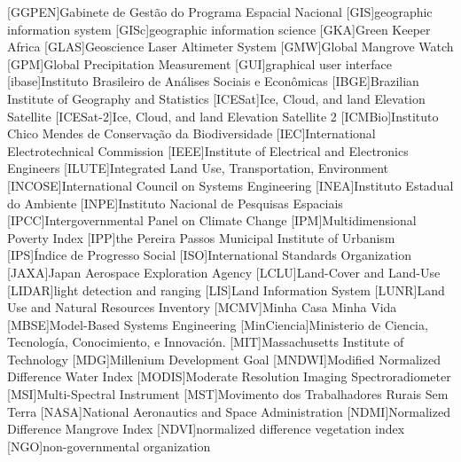\begin{acronym}[HyperLEAVES]
[GGPEN]{Gabinete de Gestão do Programa Espacial Nacional}
[GIS]{geographic information system}
[GISc]{geographic information science}
[GKA]{Green Keeper Africa}
[GLAS]{Geoscience Laser Altimeter System}
[GMW]{Global Mangrove Watch}
[GPM]{Global Precipitation Measurement}
[GUI]{graphical user interface}
[ibase]{Instituto Brasileiro de Análises Sociais e Econômicas}
[IBGE]{Brazilian Institute of Geography and Statistics}
[ICESat]{Ice, Cloud, and land Elevation Satellite}
[ICESat-2]{Ice, Cloud, and land Elevation Satellite 2}
[ICMBio]{Instituto Chico Mendes de Conservação da Biodiversidade}
[IEC]{International Electrotechnical Commission}
[IEEE]{Institute of Electrical and Electronics Engineers}
[ILUTE]{Integrated Land Use, Transportation, Environment}
[INCOSE]{International Council on Systems Engineering}
[INEA]{Instituto Estadual do Ambiente}
[INPE]{Instituto Nacional de Pesquisas Espaciais}
[IPCC]{Intergovernmental Panel on Climate Change}
[IPM]{Multidimensional Poverty Index}
[IPP]{the Pereira Passos Municipal Institute of Urbanism}
[IPS]{Índice de Progresso Social}
[ISO]{International Standards Organization}
[JAXA]{Japan Aerospace Exploration Agency}
[LCLU]{Land-Cover and Land-Use}
[LIDAR]{light detection and ranging}
[LIS]{Land Information System}
[LUNR]{Land Use and Natural Resources Inventory}
[MCMV]{Minha Casa Minha Vida}
[MBSE]{Model-Based Systems Engineering}
[MinCiencia]{Ministerio de Ciencia, Tecnología, Conocimiento, e Innovación.}
[MIT]{Massachusetts Institute of Technology}
[MDG]{Millenium Development Goal}
[MNDWI]{Modified Normalized Difference Water Index}
[MODIS]{Moderate Resolution Imaging Spectroradiometer}
[MSI]{Multi-Spectral Instrument}
[MST]{Movimento dos Trabalhadores Rurais Sem Terra}
[NASA]{National Aeronautics and Space Administration}
[NDMI]{Normalized Difference Mangrove Index}
[NDVI]{normalized difference vegetation index}
[NGO]{non-governmental organization}

\end{acronym}
